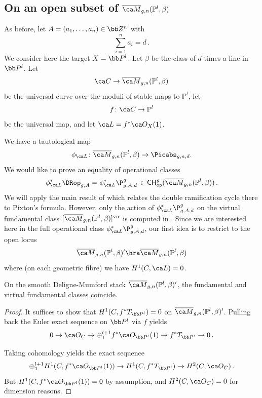 \subsection{On an open subset of $\Mbar_{g,n}(\mathbb{P}^l,\beta)$}\label{sec:projective_target}


\newcommand{\kk}{l}
As before, let $A=(a_1,\ldots,a_n) \in \bb Z^n$ with $$\sum_{i=1}^n a_i=d\,.$$
We consider here the target $X = \bb P^\kk$.
Let $\beta$ be the class of $d$ times a line in $\bb P^\kk$.
Let
$$\ca C \to \Mbar_{g,n}(\mathbb{P}^l,\beta)$$
be the universal curve over the moduli of stable maps to $\mathbb{P}^l$, let
$$f\colon \ca C \to \mathbb{P}^l$$ be the universal map, and
let $\ca L = f^*\ca O_X(1)$.


We have a tautological map
\begin{equation}
\phi_{\ca L} \colon \Mbar_{g,n}(\mathbb{P}^l,\beta) \to \Picabs_{g,n,d}.
\end{equation}
We would like to prove an equality of operational classes
$$\phi_{\ca L}^*\DRop_{g,A}=\phi_{\ca L}^*{\P_{g,A,d}^g}\, \in \mathsf{CH}_{\mathsf{op}}^g(\Mbar_{g,n}(\mathbb{P}^l,\beta))\, .$$
We will apply  the main result of \cite{Janda2018Double-ramifica} which
relates the double ramification cycle there to
Pixton's formula. However,
only the action of $\phi_{\ca L}^*{\P_{g,A,d}^g}$ on the
virtual fundamental class
$[ \Mbar_{g,n}(\mathbb{P}^l,\beta)]^\textup{vir}$ is computed in \cite{Janda2018Double-ramifica}.
Since we are interested here in the full operational class $\phi_{\ca L}^*{\P_{g,A,d}^g}$,
our first idea is to restrict to the open locus
$$\Mbar_{g,n}(\mathbb{P}^l,\beta)' \hra \Mbar_{g,n}(\mathbb{P}^l,\beta)$$
where (on each geometric fibre) we have $H^1(C, \ca L) = 0$.

\begin{lemma}
\notready\label{lem:fun_eq_vfc}
On the smooth Deligne-Mumford stack $\Mbar_{g,n}(\mathbb{P}^l,\beta)'$, the fundamental and virtual fundamental classes coincide.
\end{lemma}
\begin{proof}
It suffices to show that $H^1(C, f^*T_{\bb P^\kk}) = 0$ on $\Mbar_{g,n}(\mathbb{P}^l,\beta)'$. Pulling back the Euler exact sequence on $\bb P^\kk$ via $f$ yields
\begin{equation}
0 \to \ca O_C \to \oplus_{1}^{\kk+1} f^*\ca O_{\bb P^\kk}(1) \to f^*T_{\bb P^\kk} \to 0\, .
\end{equation}

 Taking cohomology yields the exact sequence
\begin{equation}
\oplus_{1}^{\kk+1} H^1(C, f^*\ca O_{\bb P^\kk}(1)) \to H^1(C, f^*T_{\bb P^\kk}) \to H^2(C, \ca O_C)\, .
\end{equation}
But $H^1(C, f^*\ca O_{\bb P^\kk}(1)) = 0$ by assumption, and $H^2(C, \ca O_C) = 0$ for dimension reasons. %
\end{proof}

